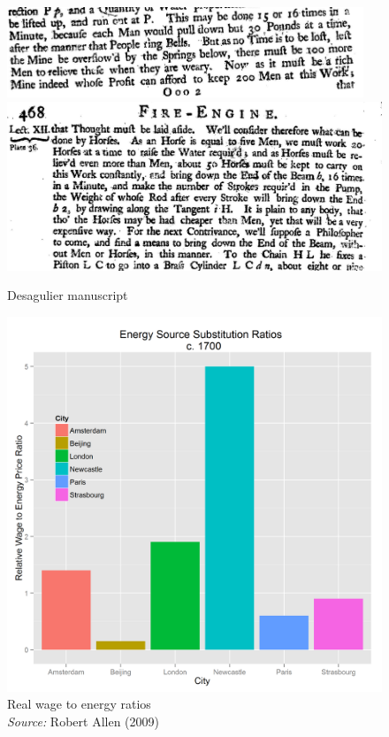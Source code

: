 \documentclass[final]{beamer}
\begin{document}
\begin{frame}
\begin{figure}[p!]
		\caption{Desagulier manuscript}
		\label{fig:desagulier}		
		\center
		\includegraphics[width=0.95\textwidth]{desagulier1}\\
		\includegraphics[width=1.05\textwidth]{desagulier2}
\end{figure}
\end{frame}

\begin{frame}
\begin{figure}[p!]
\center
\caption{Real wage to energy ratios\\\textit{Source:} Robert Allen (2009)}
\label{fig:wage-energy}
\includegraphics[height=0.8\textheight]{wage-energy.png}
\end{figure}
\end{frame}
\end{document}
